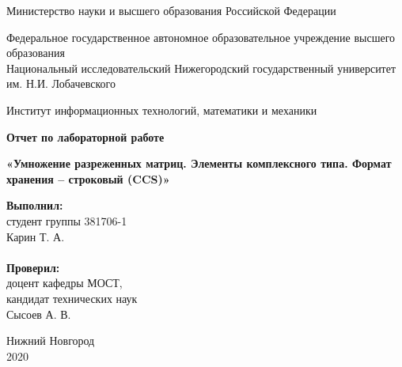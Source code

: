 \documentclass{report}
\begin{document}
\begin{titlepage}

\begin{center}
Министерство науки и высшего образования Российской Федерации
\end{center}

\begin{center}
Федеральное государственное автономное образовательное учреждение высшего образования \\
Национальный исследовательский Нижегородский государственный университет им. Н.И. Лобачевского
\end{center}

\begin{center}
Институт информационных технологий, математики и механики
\end{center}

\vspace{3em}

\begin{center}
\textbf{\Large Отчет по лабораторной работе} \\
\end{center}
\begin{center}
\textbf{\Large «Умножение разреженных матриц. Элементы комплексного типа. Формат хранения -- строковый (CCS)»} \\
\end{center}

\vspace{4em}

\newbox{\lbox}
\newlength{\maxl}
\setlength{\maxl}{\wd\lbox}
\hfill\parbox{7cm}{
\hspace*{5cm}\hspace*{-5cm}\textbf{Выполнил:} \\ студент группы 381706-1 \\ Карин Т. А.\\
\\
\hspace*{5cm}\hspace*{-5cm}\textbf{Проверил:}\\ доцент кафедры МОСТ, \\ кандидат технических наук \\ Сысоев А. В.
}

\vspace{\fill}

\begin{center} Нижний Новгород \\ 2020 \end{center}

\end{titlepage}
\end{document}
